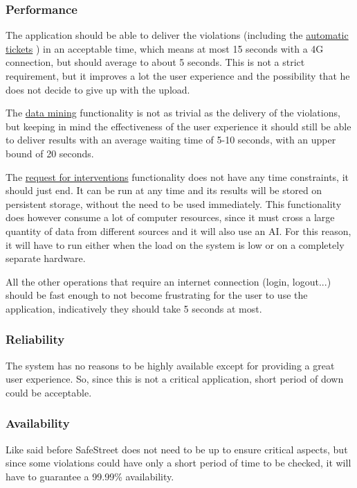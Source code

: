 \subsubsection{Performance}
    The application should be able to deliver the violations (including the
    \hyperref[sec:automatic_tickets]{automatic tickets}
    ) in an acceptable time,
    which means at most 15 seconds with a 4G connection, but should average to about 5 seconds.
    This is not a strict requirement, but it improves a lot the user experience and the possibility
    that he does not decide to give up with the upload.

    The 
    \hyperref[sec:data_mining]{data mining}
    functionality is not as trivial as the delivery of the violations, but keeping in 
    mind the effectiveness of the user experience it should still be able to deliver results with an
    average waiting time of 5-10 seconds, with an upper bound of 20 seconds.

    The
    \hyperref[sec:request_for_interventions]{request for interventions}
    functionality does not have any time constraints, it should just end. It can be run at any time and
    its results will be stored on persistent storage, without the need to be used immediately.
    This functionality does however consume a lot of computer resources, since it must cross a large quantity
    of data from different sources and it will also use an AI. For this reason, it will have to run
    either when the load on the system is low or on a completely separate hardware.

    All the other operations that require an internet connection (login, logout...) should be fast enough
    to not become frustrating for the user to use the application, indicatively they should take 5 seconds at most.
    
\subsubsection{Reliability}
    The system has no reasons to be highly available except for providing a great user experience.
    So, since this is not a critical application, short period of down could be acceptable.
    
\subsubsection{Availability}
	Like said before SafeStreet does not need to be up to ensure critical aspects, but since some violations could
	have only a short period of time to be checked, it will have to guarantee a 99.99\% availability.


